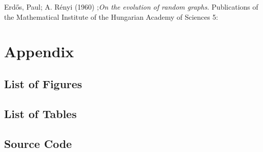 \documentclass[11pt]{article}
\begin{document}
\renewcommand{\bibname}{References}

\begin{thebibliography}{9}

Erdős, Paul; A. Rényi (1960) ;\emph{On the evolution of random graphs.} Publications of the Mathematical Institute of the Hungarian Academy of Sciences 5: 

\end{thebibliography}

\section{Appendix}

\subsection{List of Figures}

\subsection{List of Tables}

\subsection{Source Code}
\end{document}
